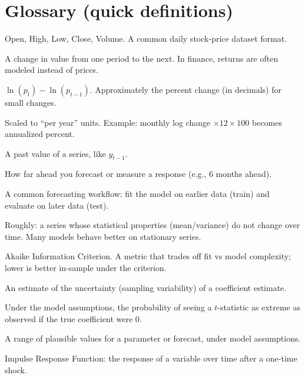 \documentclass[11pt,a4paper]{article}
\begin{document}
\section{Glossary (quick definitions)}

\begin{description}[leftmargin=2.8em, style=nextline]
  \item[OHLCV] Open, High, Low, Close, Volume. A common daily stock-price dataset format.
  \item[Return] A change in value from one period to the next. In finance, returns are often modeled instead of prices.
  \item[Log return] \(\ln(p_t) - \ln(p_{t-1})\). Approximately the percent change (in decimals) for small changes.
  \item[Annualized] Scaled to ``per year'' units. Example: monthly log change \(\times 12 \times 100\) becomes annualized percent.
  \item[Lag] A past value of a series, like \(y_{t-1}\).
  \item[Horizon] How far ahead you forecast or measure a response (e.g., 6 months ahead).
  \item[Train/test split] A common forecasting workflow: fit the model on earlier data (train) and evaluate on later data (test).
  \item[Stationary] Roughly: a series whose statistical properties (mean/variance) do not change over time. Many models behave better on stationary series.
  \item[AIC] Akaike Information Criterion. A metric that trades off fit vs model complexity; lower is better in-sample under the criterion.
  \item[Standard error] An estimate of the uncertainty (sampling variability) of a coefficient estimate.
  \item[p-value] Under the model assumptions, the probability of seeing a \(t\)-statistic as extreme as observed if the true coefficient were 0.
  \item[Confidence interval] A range of plausible values for a parameter or forecast, under model assumptions.
  \item[IRF] Impulse Response Function: the response of a variable over time after a one-time shock.
\end{description}
\end{document}
